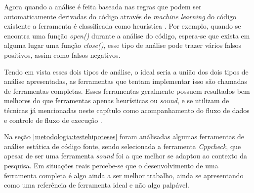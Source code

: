 Agora quando a análise é feita baseada nas regras que podem ser automaticamente
derivadas do código através de \textit{machine learning} do código existente a
ferramenta é classificada como heurística \cite{paul:2001}. Por exemplo, quando
se encontra uma função \textit{open()} durante a análise do código, espera-se
que exista em alguma lugar uma função \textit{close()}, esse tipo de análise
pode trazer vários falsos positivos, assim como falsos negativos.

Tendo em vista esses dois tipos de análise, o ideal seria a união dos dois tipos
de análise apresentadas, as ferramentas que tentam implementar isso são chamadas
de ferramentas completas. Esses ferramentas geralmente possuem resultados bem
melhores do que ferramentas apenas heurísticas ou \textit{sound}, e se utilizam
de técnicas já mencionadas neste capítulo como acompanhamento do fluxo de dados
e controle de fluxo de execução \cite{paul:2001}.

Na seção \ref{metodologia:testehipoteses} foram análisadas algumas ferramentas
de análise estática de código fonte, sendo selecionada a ferramenta
\textit{Cppcheck}, que apesar de ser uma ferramenta \textit{sound} foi a que
melhor se adaptou ao contexto da pesquisa. Em situações reais percebe-se que o
desenvolvimento de uma ferramenta completa é algo ainda a ser melhor trabalho,
ainda se apresentando como uma referência de ferramenta ideal e não algo palpável.
